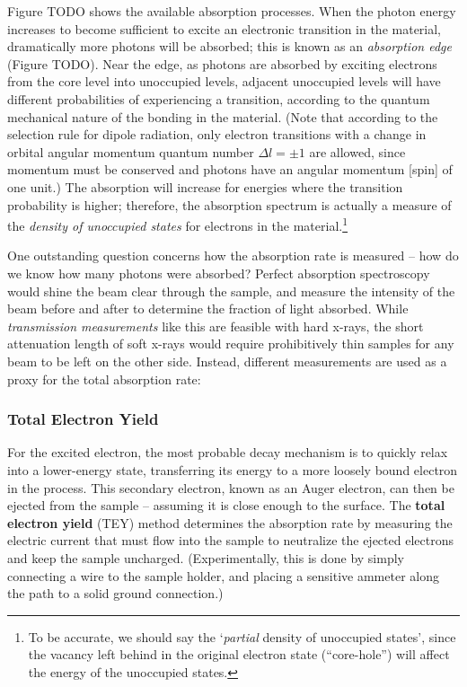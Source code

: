 Figure TODO shows the available absorption processes.  When the photon energy increases to become sufficient to excite an electronic transition in the material, dramatically more photons will be absorbed; this is known as an \emph{absorption edge} (Figure TODO).  Near the edge, as photons are absorbed by exciting electrons from the core level into unoccupied levels, adjacent unoccupied  levels will have different probabilities of experiencing a transition, according to the quantum mechanical nature of the bonding in the material.  (Note that according to the selection rule for dipole radiation, only electron transitions with a change in orbital angular momentum quantum number $\Delta l = \pm 1$ are allowed, since momentum must be conserved and photons have an angular momentum [spin] of one unit.)  The absorption will increase for energies where the transition probability is higher; therefore, the absorption spectrum is actually a measure of the \emph{density of unoccupied states} for electrons in the material.\footnote{To be accurate, we should say the `\emph{partial} density of unoccupied states', since the vacancy left behind in the original electron state (``core-hole'') will affect the energy of the unoccupied states.}

One outstanding question concerns how the absorption rate is measured -- how do we know how many photons were absorbed?  Perfect absorption spectroscopy would shine the beam clear through the sample, and measure the intensity of the beam before and after to determine the fraction of light absorbed.  While \emph{transmission measurements} like this are feasible with hard x-rays, the short attenuation length of soft x-rays would require prohibitively thin samples for any beam to be left on the other side.  Instead, different measurements are used as a proxy for the total absorption rate:
\subsubsection{Total Electron Yield}
For the excited electron, the most probable decay mechanism is to quickly relax into a lower-energy state, transferring its energy to a more loosely bound electron in the process.  This secondary electron, known as an Auger electron, can then be ejected from the sample -- assuming it is close enough to the surface.  The \textbf{total electron yield} (TEY) method determines the absorption rate by measuring the electric current that must flow into the sample to neutralize the ejected electrons and keep the sample uncharged.  (Experimentally, this is done by simply connecting a wire to the sample holder, and placing a sensitive ammeter along the path to a solid ground connection.)

